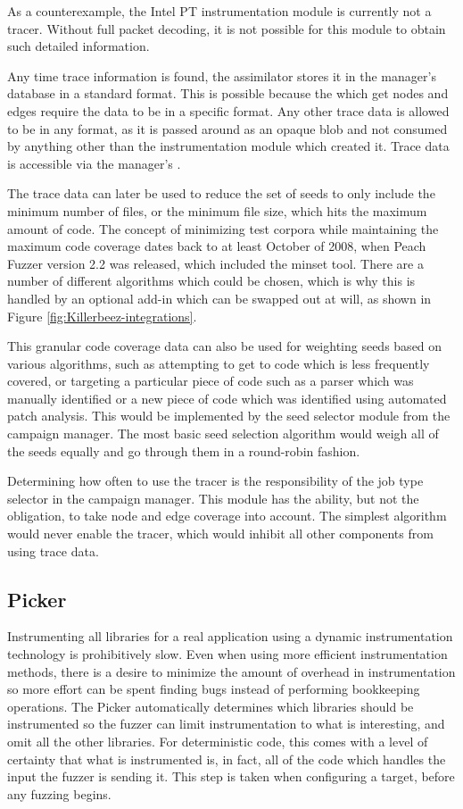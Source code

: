 As a counterexample, the Intel PT instrumentation module is currently not a
tracer.  Without full \IPT{} packet decoding, it is not possible for this
module to obtain such detailed information.

Any time trace information is found, the assimilator stores it in the manager's
database in a standard format.  This is possible because the \APIs{} which get
nodes and edges require the data to be in a specific format.  Any other trace
data is allowed to be in any format, as it is passed around as an opaque blob
and not consumed by anything other than the instrumentation module which
created it.  Trace data is accessible via the manager's \REST{} \API{}.

The trace data can later be used to reduce the set of seeds to only include the minimum
number of files, or the minimum file size, which hits the maximum amount of
code. The concept of minimizing test corpora while maintaining the maximum code
coverage dates back to at least October of 2008, when Peach Fuzzer version 2.2
was released, which included the minset tool.\cite{peach22}  There are a number
of different algorithms which could be chosen, which is why this is handled by
an optional add-in which can be swapped out at will, as shown in Figure
\ref{fig:Killerbeez-integrations}.

This granular code coverage data can also be used for weighting seeds based on
various algorithms, such as attempting to get to code which is less frequently
covered, or targeting a particular piece of code such as a parser which was
manually identified or a new piece of code which was identified using automated
patch analysis. This would be implemented by the seed selector module from the
campaign manager.  The most basic seed selection algorithm would weigh
all of the seeds equally and go through them in a round-robin fashion.

Determining how often to use the tracer is the responsibility of the job
type selector in the campaign manager.  This module has the ability, but
not the obligation, to take node and edge coverage into account.  The simplest
algorithm would never enable the tracer, which would inhibit all other
components from using trace data.

\subsection{Picker} \label{Picker}
Instrumenting all libraries for a real application using a dynamic
instrumentation technology is prohibitively slow. Even when using more
efficient instrumentation methods, there is a desire to minimize the amount of
overhead in instrumentation so more effort can be spent finding bugs instead of
performing bookkeeping operations.  The Picker automatically determines which
libraries should be instrumented so the fuzzer can limit instrumentation to
what is interesting, and omit all the other libraries. For deterministic
code, this comes with a level of certainty that what is instrumented is, in
fact, all of the code which handles the input the fuzzer is sending it. This
step is taken when configuring a target, before any fuzzing begins.

